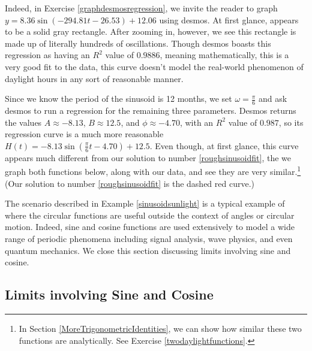 \documentclass{ximera}
\begin{document}
\begin{example}
\begin{explanation}
\begin{enumerate}
Indeed, in Exercise \ref{graphdesmosregression}, we invite the reader to graph $y = 8.36 \sin(-294.81t  - 26.53) + 12.06$ using desmos.  At first glance, appears to be a solid gray rectangle. After zooming in, however, we see this rectangle is made up of literally hundreds of oscillations.  Though desmos boasts this regression as having an $R^{2}$ value of $0.9886$, meaning mathematically, this is a very good fit to the data, this curve doesn't model the real-world phenomenon of daylight hours in any sort of reasonable manner. 



Since we know the period of the sinusoid is 12 months, we set $\omega = \frac{\pi}{6}$ and ask desmos to run a regression for the remaining three parameters.   Desmos returns the values $A \approx -8.13$, $B \approx 12.5$, and $\phi \approx -4.70$, with an $R^{2}$ value of $0.987$,  so its regression curve is a much more reasonable $H(t) = -8.13 \sin\left(\frac{\pi}{6} t - 4.70\right)+ 12.5$.  Even though, at first glance, this curve appears much different from our solution to number \ref{roughsinusoidfit}, the we graph both functions below, along with our data, and see they are very similar.\footnote{In Section \ref{MoreTrigonometricIdentities}, we can show how similar these two functions are analytically.  See Exercise \ref{twodaylightfunctions}.}  (Our solution to number \ref{roughsinusoidfit} is the dashed red curve.)

\begin{center}
 \end{center}
 
\end{enumerate}
\end{explanation}
\end{example}

The scenario described in Example \ref{sinusoidsunlight} is a typical example of where the circular functions are useful outside the context of angles or circular motion.  Indeed, sine and cosine functions are used extensively to model a wide range of periodic phenomena including signal analysis, wave physics, and even quantum mechanics.  We close this section discussing limits involving sine and cosine. 

\subsection{Limits involving Sine and Cosine}
\label{SineCosineLimits}
\end{document}
